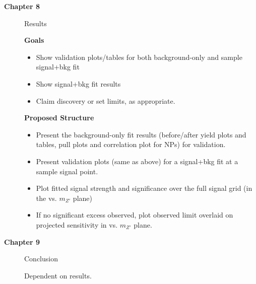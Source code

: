 \begin{description}
\item[\textbf{Chapter 8}] Results

\textbf{Goals}
\begin{itemize}
\item Show validation plots/tables for both background-only and sample signal+bkg fit
\item Show signal+bkg fit results
\item Claim discovery or set limits, as appropriate.
\end{itemize}

\textbf{Proposed Structure}
\begin{itemize}
\item Present the background-only fit results (before/after yield plots and tables, pull plots and correlation plot for NPs) for validation.
\item Present validation plots (same as above) for a signal+bkg fit at a sample signal point.
\item Plot fitted signal strength and significance over the full signal grid (in the \ms vs. $m_{Z'}$ plane)
\item If no significant excess observed, plot observed limit overlaid on projected sensitivity in \ms vs. $m_{Z'}$ plane.
\end{itemize}

\item[\textbf{Chapter 9}] Conclusion

Dependent on results.


\end{description}
